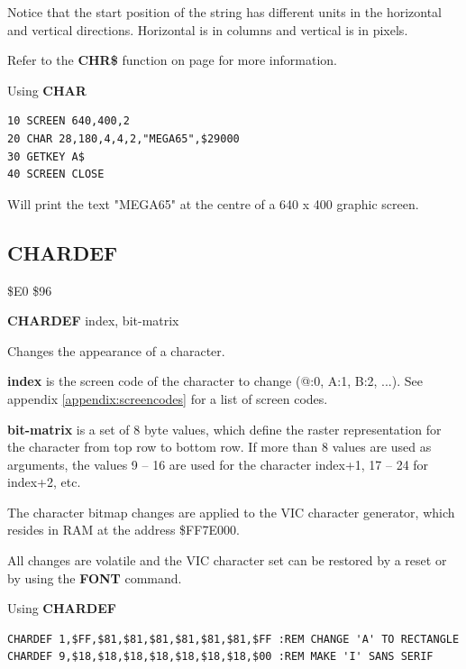 \begin{description}[leftmargin=2cm,style=nextline]
                Notice that the start position of the string has
                different units in the horizontal and vertical directions.
                Horizontal is in columns and vertical is in pixels.

                Refer to the {\bf CHR\$} function on page \pageref{BASIC 65 Functions!CHR}
                for more information.

\item [Example:] Using {\bf CHAR}
\begin{tcolorbox}[colback=black,coltext=white]
\verbatimfont{\codefont}
\begin{verbatim}
10 SCREEN 640,400,2
20 CHAR 28,180,4,4,2,"MEGA65",$29000
30 GETKEY A$
40 SCREEN CLOSE
\end{verbatim}
\end{tcolorbox}
Will print the text "MEGA65" at the centre of a 640 x 400 graphic screen.
\end{description}


\newpage
\subsection{CHARDEF}
\begin{description}[leftmargin=2cm,style=nextline]
\item [Token:] \$E0 \$96
\item [Format:] {\bf CHARDEF} index, bit-matrix
\item [Usage:] Changes the appearance of a character.

      {\bf index} is the screen code of the character to change
      (@:0, A:1, B:2, ...). See appendix
      \vref{appendix:screencodes} for a list of screen codes.

      {\bf bit-matrix} is a set of 8 byte values, which define
      the raster representation for the character from top row to bottom row.
      If more than 8 values are used as arguments, the values 9 -- 16 are used
      for the character index+1, 17 -- 24 for index+2, etc.

\item [Remarks:] The character bitmap changes are applied to the VIC
       character generator, which resides in RAM at the address \$FF7E000.

       All changes are volatile and the VIC character set can be restored by
       a reset or by using the {\bf FONT} command.

\item [Examples:] Using {\bf CHARDEF}
\begin{tcolorbox}[colback=black,coltext=white]
\verbatimfont{\codefont}
\begin{verbatim}
CHARDEF 1,$FF,$81,$81,$81,$81,$81,$81,$FF :REM CHANGE 'A' TO RECTANGLE
CHARDEF 9,$18,$18,$18,$18,$18,$18,$18,$00 :REM MAKE 'I' SANS SERIF
\end{verbatim}
\end{tcolorbox}
\end{description}

